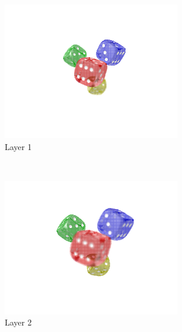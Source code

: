 \documentclass[11pt,a4paper,titlepage]{article}
\begin{document}
\begin{figure}[h]
	\centering
	\begin{subfigure}[c]{0.3\textwidth}
 		\includegraphics[width=\textwidth]{results/dice_perspective_rec_3Layers_r=0/1.png}
  		\caption{Layer 1}
	\end{subfigure}%
	~
	\begin{subfigure}[c]{0.3\textwidth}
		\includegraphics[width=\textwidth]{results/dice_perspective_rec_3Layers_r=0/2.png}
		\caption{Layer 2}
	\end{subfigure}%
	~
	\begin{subfigure}[c]{0.3\textwidth}

\end{subfigure}
\end{figure}
\end{document}
